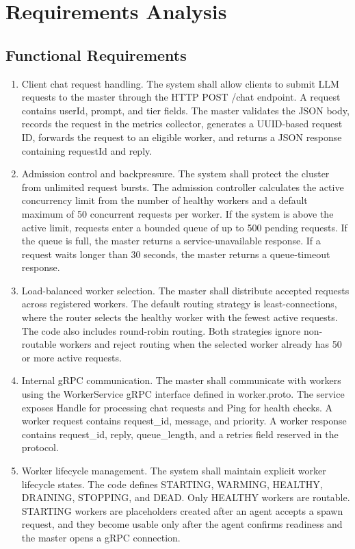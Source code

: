 \section{Requirements Analysis}

\subsection{Functional Requirements}
\begin{enumerate}[label=FR-\arabic*., leftmargin=1.8em]
  \item Client chat request handling. The system shall allow clients to submit LLM requests to the master through the HTTP POST /chat endpoint. A request contains userId, prompt, and tier fields. The master validates the JSON body, records the request in the metrics collector, generates a UUID-based request ID, forwards the request to an eligible worker, and returns a JSON response containing requestId and reply.
  \item Admission control and backpressure. The system shall protect the cluster from unlimited request bursts. The admission controller calculates the active concurrency limit from the number of healthy workers and a default maximum of 50 concurrent requests per worker. If the system is above the active limit, requests enter a bounded queue of up to 500 pending requests. If the queue is full, the master returns a service-unavailable response. If a request waits longer than 30 seconds, the master returns a queue-timeout response.
  \item Load-balanced worker selection. The master shall distribute accepted requests across registered workers. The default routing strategy is least-connections, where the router selects the healthy worker with the fewest active requests. The code also includes round-robin routing. Both strategies ignore non-routable workers and reject routing when the selected worker already has 50 or more active requests.
  \item Internal gRPC communication. The master shall communicate with workers using the WorkerService gRPC interface defined in worker.proto. The service exposes Handle for processing chat requests and Ping for health checks. A worker request contains request_id, message, and priority. A worker response contains request_id, reply, queue_length, and a retries field reserved in the protocol.
  \item Worker lifecycle management. The system shall maintain explicit worker lifecycle states. The code defines STARTING, WARMING, HEALTHY, DRAINING, STOPPING, and DEAD. Only HEALTHY workers are routable. STARTING workers are placeholders created after an agent accepts a spawn request, and they become usable only after the agent confirms readiness and the master opens a gRPC connection.

\end{enumerate}
